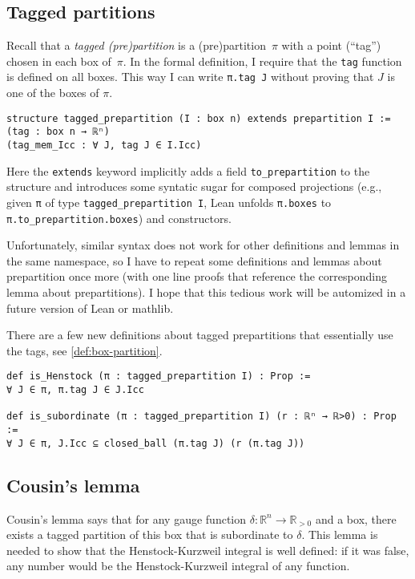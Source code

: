 \documentclass[a4paper, UKenglish,cleveref, autoref, thm-restate]{lipics-v2021}
\newcommand{\bbR}{\mathbb{R}}
\begin{document}
\subsection{Tagged partitions}%
\label{sec:tagged-partitions}

Recall that a \emph{tagged (pre)partition} is a (pre)partition~\(\pi\)
with a point (\enquote{tag}) chosen in each box of~\(\pi\). In the
formal definition, I require that the \lstinline=tag= function is
defined on all boxes. This way I can write \lstinline=π.tag J= without
proving that \(J\) is one of the boxes of \(\pi\).

\begin{lstlisting}
structure tagged_prepartition (I : box n) extends prepartition I :=
(tag : box n → ℝⁿ)
(tag_mem_Icc : ∀ J, tag J ∈ I.Icc)
\end{lstlisting}

Here the \lstinline=extends= keyword implicitly adds a field
\lstinline=to_prepartition= to the structure and introduces some
syntatic sugar for composed projections (e.g., given \lstinline=π= of
type \lstinline=tagged_prepartition I=, Lean unfolds
\lstinline=π.boxes= to \lstinline=π.to_prepartition.boxes=) and
constructors.

Unfortunately, similar syntax does not work for other definitions and
lemmas in the same namespace, so I have to repeat some definitions and
lemmas about prepartition once more (with one line proofs that
reference the corresponding lemma about prepartitions). I hope that
this tedious work will be automized in a future version of Lean or
mathlib.

There are a few new definitions about tagged prepartitions that
essentially use the tags, see \autoref{def:box-partition}.

\begin{lstlisting}
def is_Henstock (π : tagged_prepartition I) : Prop :=
∀ J ∈ π, π.tag J ∈ J.Icc

def is_subordinate (π : tagged_prepartition I) (r : ℝⁿ → ℝ>0) : Prop :=
∀ J ∈ π, J.Icc ⊆ closed_ball (π.tag J) (r (π.tag J))
\end{lstlisting}

\subsection{Cousin's lemma}\label{sec:cousins-lemma}

Cousin's lemma says that for any gauge function
\(\delta\colon\bbR^{n}\to\bbR_{>0}\) and a box, there exists a tagged
partition of this box that is subordinate to \(\delta\). This lemma is
needed to show that the Henstock-Kurzweil integral is well defined: if
it was false, any number would be the Henstock-Kurzweil integral of
any function.
\end{document}
